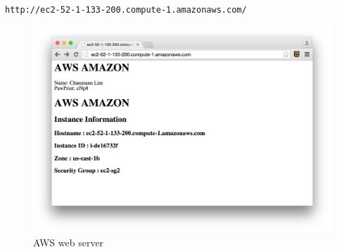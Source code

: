 \documentclass[a4paper]{article}
\begin{document}
\texttt{http://ec2-52-1-133-200.compute-1.amazonaws.com/} \\
\begin{figure}[H]
  \centering
    \includegraphics[scale=.4]{aws_web_server.png}
  \caption{AWS web server}
\end{figure} 

\end{document}
